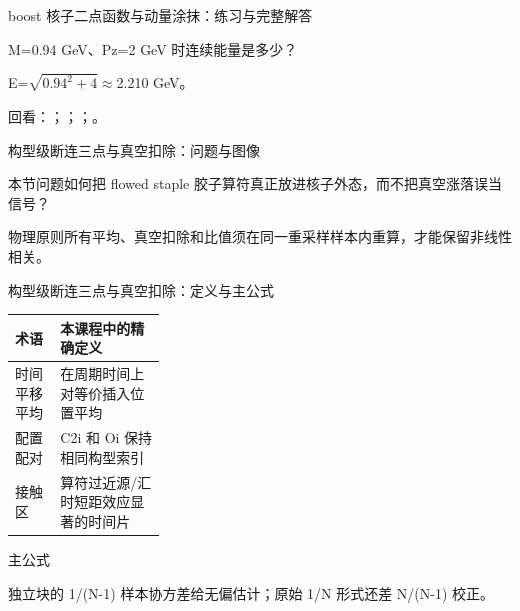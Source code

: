 \begin{frame}[t]{boost 核子二点函数与动量涂抹：练习与完整解答}
\footnotesize
\begin{block}{}M=0.94 GeV、Pz=2 GeV 时连续能量是多少？\end{block}
\begin{exampleblock}{}E=\ensuremath{\sqrt{0.94^{2}+4}}\ensuremath{\approx}2.210 GeV。\end{exampleblock}
\vfill
\scriptsize 回看：；；；。
\end{frame}

\begin{frame}[t]{构型级断连三点与真空扣除：问题与图像}
\footnotesize
\begin{block}{本节问题}如何把 flowed staple 胶子算符真正放进核子外态，而不把真空涨落误当信号？\end{block}
\begin{block}{物理原则}\quad 所有平均、真空扣除和比值须在同一重采样样本内重算，才能保留非线性相关。\end{block}
\end{frame}

\begin{frame}[t]{构型级断连三点与真空扣除：定义与主公式}
\footnotesize\begin{tabularx}{\linewidth}{p{0.30\linewidth}Y}
\toprule 术语 & 本课程中的精确定义\\\midrule
{} 时间平移平均 & 在周期时间上对等价插入位置平均\\
 配置配对 & C2i 和 Oi 保持相同构型索引\\
 接触区 & 算符过近源/\allowbreak{}汇时短距效应显著的时间片\\
\bottomrule\end{tabularx}\vspace{0.15cm}
\begin{block}{ 主公式}\centering{}\end{block}
独立块的 1/\allowbreak{}(N-1) 样本协方差给无偏估计；原始 1/\allowbreak{}N 形式还差 N/\allowbreak{}(N-1) 校正。
\end{frame}

